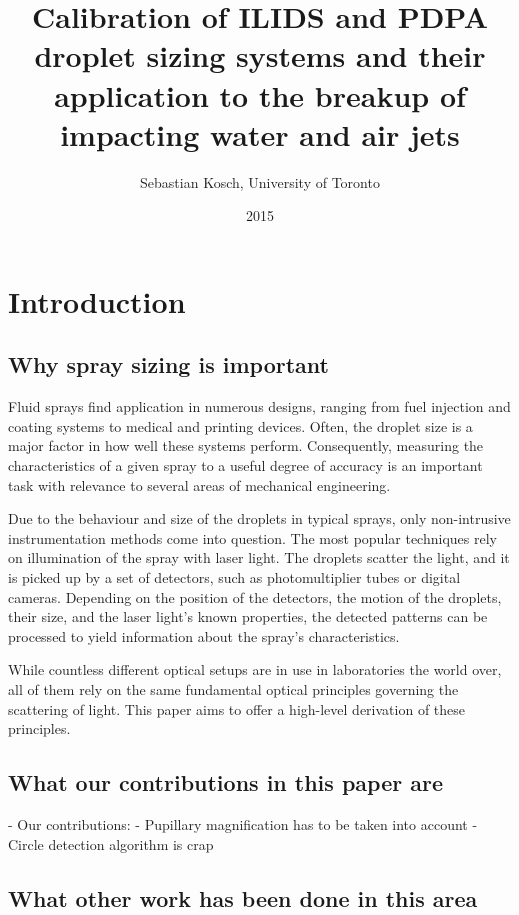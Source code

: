 \documentclass[11.5pt]{book}
\begin{document}
\title{Calibration of ILIDS and PDPA droplet sizing systems and their
application to the breakup of impacting water and air jets}
\author{Sebastian Kosch, University of Toronto}
\date{2015}
\maketitle

\printnomenclature[5em]

\chapter{Introduction}
\section{Why spray sizing is important}

Fluid sprays find application in numerous designs, ranging from fuel injection
and coating systems to medical and printing devices. Often, the droplet size is
a major factor in how well these systems perform. Consequently, measuring the
characteristics of a given spray to a useful degree of accuracy is an important
task with relevance to several areas of mechanical engineering.

Due to the behaviour and size of the droplets in typical sprays, only
non-intrusive instrumentation methods come into question. The most popular
techniques rely on illumination of the spray with laser light. The droplets
scatter the light, and it is picked up by a set of detectors, such as
photomultiplier tubes or digital cameras. Depending on the position of the
detectors, the motion of the droplets, their size, and the laser light's known
properties, the detected patterns can be processed to yield information about
the spray's characteristics.

While countless different optical setups are in use in laboratories the world
over, all of them rely on the same fundamental optical principles governing the
scattering of light. This paper aims to offer a high-level derivation of these
principles.

\section{What our contributions in this paper are}
- Our contributions:
    - Pupillary magnification has to be taken into account
    - Circle detection algorithm is crap
\section{What other work has been done in this area}
\end{document}
